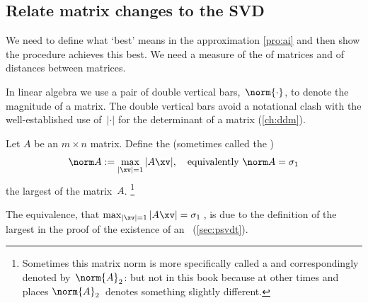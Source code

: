 \subsection{Relate matrix changes to the SVD}
\label{sec:rmmsvd}


We need to define what `best' means in the approximation \cref{pro:ai} and then show the procedure achieves this best.
We need a measure of the  of matrices and of distances between matrices.

In linear algebra we use a pair of double vertical bars,~\(\norm{\cdot}\), to  denote the magnitude of a matrix. 
The double vertical bars avoid a notational clash with the well-established use of~\(|\cdot|\) for the determinant of a matrix (\cref{ch:ddm}).

\begin{definition} \label{def:norm} 
Let \(A\) be an \(m\times n\) matrix.  
Define the  (sometimes called the )
\begin{equation}
\norm A:=\max_{|\xv|=1}|A\xv|, 
\quad\text{equivalently }\norm A=\sigma_1
\end{equation}
the largest  of the matrix~\(A\).
\footnote{Sometimes this matrix norm is more specifically called a  and correspondingly denoted by~\(\norm{A}_2\): but not in this book because at other times and places \(\norm{A}_2\)~denotes something slightly different.}
\end{definition}
The equivalence, that \(\max_{|\xv|=1}|A\xv|=\sigma_1\)\,, is due to the definition of the largest  in the proof of the existence of an \svd\ (\cref{sec:psvdt}).



